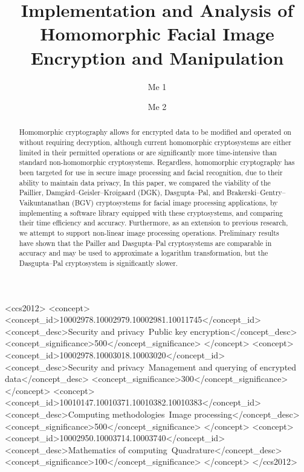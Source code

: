 \documentclass[sigconf]{acmart}
\begin{document}
\title{Implementation and Analysis of Homomorphic Facial Image Encryption and Manipulation}

\author{Me 1}

\author{Me 2}


\renewcommand{\shorttitle}{Impl. and Analysis of Homomorphic Facial Image Encryption and Manipulation}

\begin{abstract}
Homomorphic cryptography allows for encrypted data to be modified and operated on without requiring decryption, although current homomorphic cryptosystems are either limited in their permitted operations or are significantly more time-intensive than standard non-homomorphic cryptosystems. Regardless, homomorphic cryptography has been targeted for use in secure image processing and facial recognition, due to their ability to maintain data privacy, In this paper, we compared the viability of the Paillier, Damg{\aa}rd--Geisler--Kr{\o}igaard (DGK), Dasgupta--Pal, and Brakerski--Gentry--Vaikuntanathan (BGV) cryptosystems for facial image processing applications, by implementing a software library equipped with these cryptosystems, and comparing their time efficiency and accuracy. Furthermore, as an extension to previous research, we attempt to support non-linear image processing operations. Preliminary results have shown that the Pailler and Dasgupta--Pal cryptosystems are comparable in accuracy and may be used to approximate a logarithm transformation, but the Dasgupta--Pal cryptosystem is significantly slower.
\end{abstract}

%
%
\begin{CCSXML}
  <ccs2012>
  <concept>
  <concept_id>10002978.10002979.10002981.10011745</concept_id>
  <concept_desc>Security and privacy~Public key encryption</concept_desc>
  <concept_significance>500</concept_significance>
  </concept>
  <concept>
  <concept_id>10002978.10003018.10003020</concept_id>
  <concept_desc>Security and privacy~Management and querying of encrypted data</concept_desc>
  <concept_significance>300</concept_significance>
  </concept>
  <concept>
  <concept_id>10010147.10010371.10010382.10010383</concept_id>
  <concept_desc>Computing methodologies~Image processing</concept_desc>
  <concept_significance>500</concept_significance>
  </concept>
  <concept>
  <concept_id>10002950.10003714.10003740</concept_id>
  <concept_desc>Mathematics of computing~Quadrature</concept_desc>
  <concept_significance>100</concept_significance>
  </concept>
  </ccs2012>
\end{CCSXML}
\end{document}
